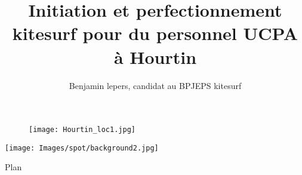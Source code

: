 \documentclass[10pt,a4paper]{beamer}
\author{Benjamin lepers, candidat au BPJEPS kitesurf}
\begin{document}
\title{Initiation et perfectionnement
 kitesurf pour du personnel UCPA à Hourtin}
\begin{frame}
\titlepage
\begin{figure}
\texttt{[image: Hourtin\_loc1.jpg]} 
\end{figure}
\end{frame}

{
{
   \texttt{[image: Images/spot/background2.jpg]}
}
\begin{frame}{Plan}
\tableofcontents
\end{frame}
}



% 

\end{document}
